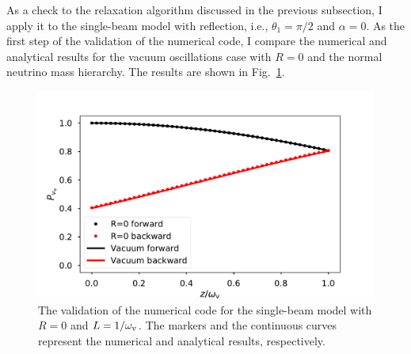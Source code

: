 As a check to the relaxation algorithm discussed in the previous subsection, I apply it to the single-beam model with reflection, i.e., $\theta_1=\pi/2$ and $\alpha=0$. As the first step of the validation of the numerical code, I compare the numerical and analytical results for the vacuum oscillations case with $R=0$ and the normal neutrino mass hierarchy. The results are shown in Fig.~\ref{chap:halo-sec:num-fig:compare-vac-validate}.

\begin{figure}[htbp]
    \centering
    \includegraphics[width=\textwidth]{chapters/assets/halo/validate-using-vacuum-r-0-mu-1}
    \caption{The validation of the numerical code for the single-beam model with $R=0$ and $L=1/\omega_\mathrm v$. The markers and the continuous curves represent the numerical and analytical results, respectively. }
    \label{chap:halo-sec:num-fig:compare-vac-validate}
\end{figure}

